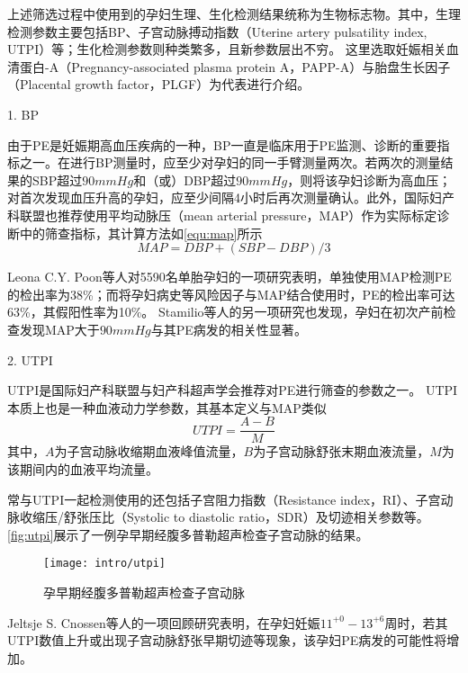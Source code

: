 上述筛选过程中使用到的孕妇生理、生化检测结果统称为生物标志物。其中，生理检测参数主要包括BP、子宫动脉搏动指数（Uterine artery pulsatility index, UTPI）等；生化检测参数则种类繁多，且新参数层出不穷\cite{Rene2008,Zhong2015,Zeisler2016,Rana2012}。
这里选取妊娠相关血清蛋白-A（Pregnancy-associated plasma protein A，PAPP-A）与胎盘生长因子（Placental growth factor，PLGF）为代表进行介绍。

1. BP

由于PE是妊娠期高血压疾病的一种，BP一直是临床用于PE监测、诊断的重要指标之一\cite{OAG9,HDASOM,2000s1}。在进行BP测量时，应至少对孕妇的同一手臂测量两次。若两次的测量结果的SBP超过$90mmHg$和（或）DBP超过$90mmHg$，则将该孕妇诊断为高血压；
对首次发现血压升高的孕妇，应至少间隔4小时后再次测量确认\cite{OAG9}。此外，国际妇产科联盟也推荐使用平均动脉压（mean arterial pressure，MAP）作为实际标定诊断中的筛查指标\cite{FIGO}，其计算方法如\autoref{equ:map}所示
\begin{equation}
    \label{equ:map}
    MAP=DBP+(SBP-DBP)/3
\end{equation}

Leona C.Y. Poon等人对5590名单胎孕妇的一项研究表明，单独使用MAP检测PE的检出率为38\%；而将孕妇病史等风险因子与MAP结合使用时，PE的检出率可达63\%，其假阳性率为10\%\cite{Poon2008}。
Stamilio等人的另一项研究也发现，孕妇在初次产前检查发现MAP大于$90mmHg$与其PE病发的相关性显著\cite{Stamilio2000}。

2. UTPI

UTPI是国际妇产科联盟与妇产科超声学会推荐对PE进行筛查的参数之一\cite{FIGO,Sotiriadis2019}。
UTPI本质上也是一种血液动力学参数，其基本定义与MAP类似\cite{Cnossen2008}
\begin{equation}
    \label{equ:utpi}
    UTPI=\frac{A-B}{M}
\end{equation}
其中，$A$为子宫动脉收缩期血液峰值流量，$B$为子宫动脉舒张末期血液流量，$M$为该期间内的血液平均流量。

常与UTPI一起检测使用的还包括子宫阻力指数（Resistance index，RI）、子宫动脉收缩压/舒张压比（Systolic to diastolic ratio，SDR）及切迹相关参数等\cite{Cnossen2008}。
\autoref{fig:utpi}展示了一例孕早期经腹多普勒超声检查子宫动脉的结果\cite{Sotiriadis2019}。
\begin{figure}[htbp]
    \centering
    \texttt{[image: intro/utpi]}
    \caption{\label{fig:utpi}孕早期经腹多普勒超声检查子宫动脉}
\end{figure}

Jeltsje S. Cnossen等人\cite{Cnossen2008}的一项回顾研究表明，在孕妇妊娠$11^{+0}-13^{+6}$周时，若其UTPI数值上升或出现子宫动脉舒张早期切迹等现象，该孕妇PE病发的可能性将增加\cite{OAG9,Plasencia2008}。

